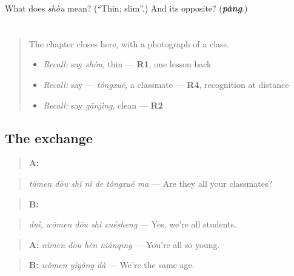 \begin{tcolorbox}[breakable,colback=teal!4,colframe=teal!35!black,title={Before you move on}]
What does \emph{shòu} mean? (\textquotedblleft{}Thin; slim\textquotedblright{}.) And its opposite? (\emph{\textbf{pàng}}.)
\end{tcolorbox}
\section[Practice]{}

\label{lesson:ZH-C94-practice}



\begin{quote}
The chapter closes here, with a photograph of a class.

\begin{itemize}
\raggedright
  \item \emph{Recall:} say \emph{shòu}, thin — \textbf{R1}, one lesson back
  \item \emph{Recall:} say  — \emph{tóngxué}, a classmate — \textbf{R4}, recognition at distance
  \item \emph{Recall:} say \emph{gānjìng}, clean — \textbf{R2}
\end{itemize}
\end{quote}

\subsection*{The exchange}
\begin{quote}
\textbf{A:} 
\end{quote}

\begin{quote}
\emph{tāmen dōu shì nǐ de tóngxué ma} — Are they all your classmates?
\end{quote}

\begin{quote}
\textbf{B:}  
\end{quote}

\begin{quote}
\emph{duì, wǒmen dōu shì xuésheng} — Yes, we're all students.
\end{quote}

\begin{quote}
\textbf{A:} \emph{nǐmen dōu hěn niánqīng} — You're all so young.
\end{quote}

\begin{quote}
\textbf{B:} \emph{wǒmen yíyàng dà} — We're the same age.
\end{quote}

